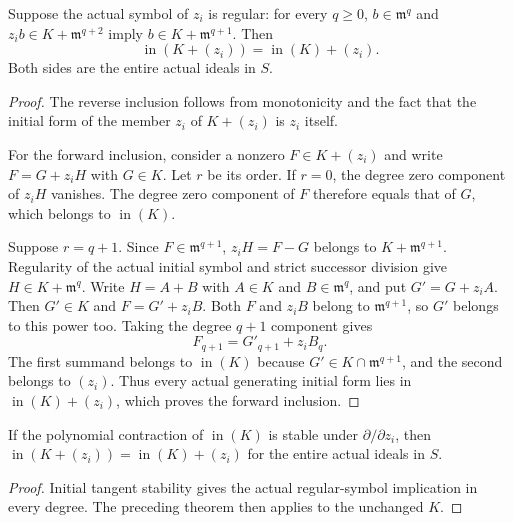 \begin{theorem}
\label{hir:actual-initial-coordinate-quotient-regular-symbol-equality}
\leanok
Suppose the actual symbol of $z_i$ is regular: for every $q\geq0$,
$b\in\mathfrak m^q$ and $z_i b\in K+\mathfrak m^{q+2}$ imply
$b\in K+\mathfrak m^{q+1}$. Then
\[
 \operatorname{in}(K+(z_i))=\operatorname{in}(K)+(z_i).
\]
Both sides are the entire actual ideals in $S$.
\end{theorem}
\begin{proof}
The reverse inclusion follows from monotonicity and the fact that the
initial form of the member $z_i$ of $K+(z_i)$ is $z_i$ itself.

For the forward inclusion, consider a nonzero $F\in K+(z_i)$ and write
$F=G+z_iH$ with $G\in K$. Let $r$ be its order. If $r=0$, the degree
zero component of $z_iH$ vanishes. The degree zero component of $F$
therefore equals that of $G$, which belongs to $\operatorname{in}(K)$.

Suppose $r=q+1$. Since $F\in\mathfrak m^{q+1}$,
$z_iH=F-G$ belongs to $K+\mathfrak m^{q+1}$. Regularity of the
actual initial symbol and strict successor division give
$H\in K+\mathfrak m^q$. Write $H=A+B$ with
$A\in K$ and $B\in\mathfrak m^q$, and put $G'=G+z_iA$.
Then $G'\in K$ and $F=G'+z_iB$. Both $F$ and $z_iB$ belong to
$\mathfrak m^{q+1}$, so $G'$ belongs to this power too. Taking the
degree $q+1$ component gives
\[
 F_{q+1}=G'_{q+1}+z_iB_q.
\]
The first summand belongs to $\operatorname{in}(K)$ because
$G'\in K\cap\mathfrak m^{q+1}$, and the second belongs to $(z_i)$.
Thus every actual generating initial form lies in
$\operatorname{in}(K)+(z_i)$, which proves the forward inclusion.
\end{proof}

\begin{corollary}
\label{hir:actual-initial-coordinate-quotient-equality}
\leanok
If the polynomial contraction of $\operatorname{in}(K)$ is stable under
$\partial/\partial z_i$, then
$\operatorname{in}(K+(z_i))=\operatorname{in}(K)+(z_i)$ for the entire
actual ideals in $S$.
\end{corollary}
\begin{proof}
Initial tangent stability gives the actual regular-symbol implication in
every degree. The preceding theorem then applies to the unchanged $K$.
\end{proof}

